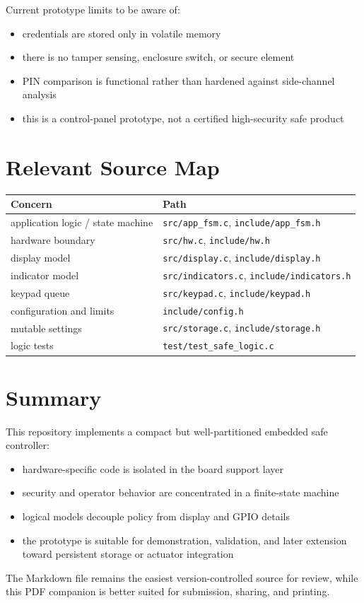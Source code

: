 \documentclass[11pt,a4paper]{article}
\begin{document}
Current prototype limits to be aware of:

\begin{itemize}[leftmargin=1.5em]
\item credentials are stored only in volatile memory
\item there is no tamper sensing, enclosure switch, or secure element
\item PIN comparison is functional rather than hardened against side-channel analysis
\item this is a control-panel prototype, not a certified high-security safe product
\end{itemize}

\section{Relevant Source Map}

\begin{tabularx}{\textwidth}{l X}
\toprule
\textbf{Concern} & \textbf{Path} \\
\midrule
application logic / state machine & \texttt{src/app\_fsm.c}, \texttt{include/app\_fsm.h} \\
hardware boundary & \texttt{src/hw.c}, \texttt{include/hw.h} \\
display model & \texttt{src/display.c}, \texttt{include/display.h} \\
indicator model & \texttt{src/indicators.c}, \texttt{include/indicators.h} \\
keypad queue & \texttt{src/keypad.c}, \texttt{include/keypad.h} \\
configuration and limits & \texttt{include/config.h} \\
mutable settings & \texttt{src/storage.c}, \texttt{include/storage.h} \\
logic tests & \texttt{test/test\_safe\_logic.c} \\
\bottomrule
\end{tabularx}

\section{Summary}

This repository implements a compact but well-partitioned embedded safe controller:

\begin{itemize}[leftmargin=1.5em]
\item hardware-specific code is isolated in the board support layer
\item security and operator behavior are concentrated in a finite-state machine
\item logical models decouple policy from display and GPIO details
\item the prototype is suitable for demonstration, validation, and later extension toward persistent storage or actuator integration
\end{itemize}

The Markdown file remains the easiest version-controlled source for review, while this PDF companion
is better suited for submission, sharing, and printing.
\end{document}
